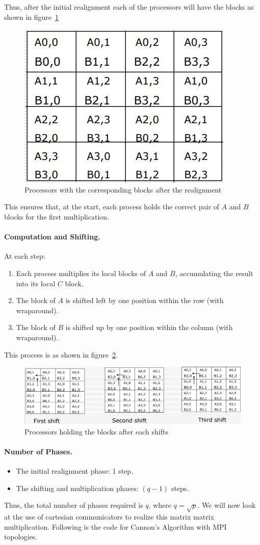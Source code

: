 \documentclass[12pt]{book}
\begin{document}
Thus, after the initial realignment each of the processors will have the blocks as shown in figure~\ref{fig:init_realign}
\begin{figure}[htbp]
    \centering
    \includegraphics[width=0.5\linewidth]{images/init_realign.png}
    \caption{Processors with the corresponding blocks after the realignment}
    \label{fig:init_realign}
\end{figure}
This ensures that, at the start, each process holds the correct pair of $A$ and $B$ blocks for the first multiplication.

\paragraph{Computation and Shifting.}  
At each step:
\begin{enumerate}
    \item Each process multiplies its local blocks of $A$ and $B$, accumulating the result into its local $C$ block.
    \item The block of $A$ is shifted left by one position within the row (with wraparound).
    \item The block of $B$ is shifted up by one position within the column (with wraparound).
\end{enumerate}
This process is as shown in figure~\ref{fig:shift_cannon}.
\begin{figure}
    \centering
    \includegraphics[width=\linewidth]{images/cannon_shift.png}
    \caption{Processors holding the blocks after each shifts}
    \label{fig:shift_cannon}
\end{figure}
\paragraph{Number of Phases.}  
\begin{itemize}
    \item The initial realignment phase: 1 step.
    \item The shifting and multiplication phases: $(q-1)$ steps.
\end{itemize}
Thus, the total number of phases required is $q$, where $q = \sqrt{p}$. We will now look at the use of cartesian communicators to realize this matrix matrix multiplication.
Following is the code for Cannon's Algorithm with MPI topologies.
\end{document}
